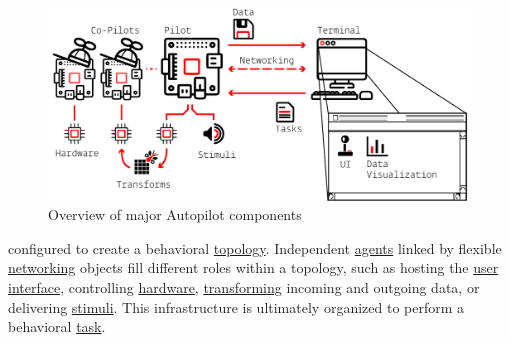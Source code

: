 \begin{figure}
\includegraphics[]{figures/whole_system_black.pdf}
\caption{Overview of major Autopilot components}
\end{figure}

\break configured to create a behavioral \hyperref[sec:topology]{topology}. Independent \hyperref[sec:agents]{agents} linked by flexible \hyperref[sec:networking]{networking} objects fill different roles within a topology, such as hosting the \hyperref[sec:ui]{user interface}, controlling \hyperref[sec:hardware]{hardware}, \hyperref[sec:transforms]{transforming} incoming and outgoing data, or delivering \hyperref[sec:stim]{stimuli}. This infrastructure is ultimately organized to perform a behavioral \hyperref[sec:tasks]{task}.